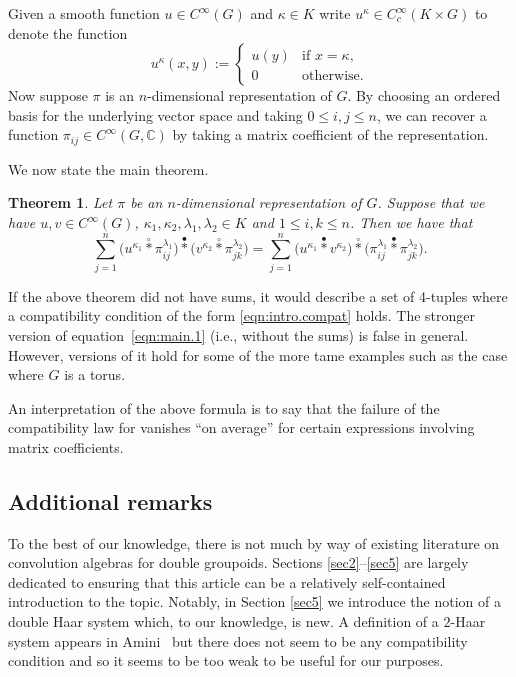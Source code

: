 \documentclass[10pt,a4paper]{amsart}
\numberwithin{equation}{section}
\newtheorem{Theorem}{Theorem}[section]
\theoremstyle{definition}
\newcommand{\BBC}{\mathbb{C}}
\newcommand{\stardot}{\overset{{\bullet}}{*}}
\newcommand{\starcirc}{\overset{\circ}{*}}
\begin{document}
Given a smooth function $ u \in C^\infty(G) $ and $ \kappa \in K $ write $ u^\kappa \in C^\infty_c(K \times G) $ to denote the function
\[
u^\kappa (x,y) :=
\begin{cases}
  u(y)  & \text{if } x = \kappa, \\
  0  & \text{otherwise}.
\end{cases}
\]
Now suppose $ \pi $ is an $ n $-dimensional representation of $ G $. By choosing an ordered basis for the underlying vector space and taking $ 0 \le i,j \le n $, we can recover a function $ \pi_{ij} \in C^\infty(G, \BBC) $ by taking a matrix coefficient of the representation.

We now state the main theorem.

\begin{Theorem}
Let $ \pi $ be an $ n$-dimensional representation of $ G $. Suppose that we have $u,v \in C^\infty(G)$, $ \kappa_1, \kappa_2, \lambda_1, \lambda_2 \in K $ and
$ 1 \le i, k \le n$.
Then we have that
  \begin{equation}\label{eqn:main.1}
   \sum_{j = 1}^{n} \big( u^{\kappa_1} \starcirc \pi_{ij}^{\lambda_1} \big) \stardot \big( v^{\kappa_2} \starcirc \pi_{jk}^{\lambda_2} \big) =   \sum_{j = 1}^{n} \big( u^{\kappa_1} \stardot  v^{\kappa_2} \big) \starcirc \big(\pi_{ij}^{\lambda_1} \stardot \pi_{jk}^{\lambda_2} \big).
  \end{equation}
\end{Theorem}
If the above theorem did not have sums, it would describe a set of 4-tuples where a compatibility condition of the form \eqref{eqn:intro.compat} holds. The stronger version of equation~\eqref{eqn:main.1} (i.e., without the sums) is false in general. However, versions of it hold for some of the more tame examples such as the case where $ G $ is a torus.

An interpretation of the above formula is to say that the failure of the compatibility law for vanishes ``on average'' for certain expressions involving matrix coefficients.

\subsection{Additional remarks}
To the best of our knowledge, there is not much by way of existing literature on convolution algebras for double groupoids. Sections \ref{sec2}--\ref{sec5} are largely dedicated to ensuring that this article can be a relatively self-contained introduction to the topic. Notably, in Section \ref{sec5} we introduce the notion of a double Haar system which, to our knowledge, is new. A definition of a $ 2$-Haar system appears in Amini~\cite{Amini} but there does not seem to be any compatibility condition and so it seems to be too weak to be useful for our purposes.
\end{document}

